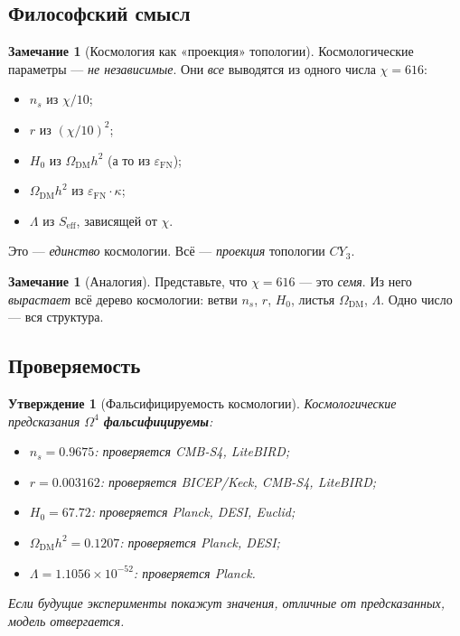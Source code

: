 \documentclass[11pt,a4paper]{article}
\newcommand{\CY}{CY_3}
\newcommand{\Om}{\Omega^4}
\newcommand{\epsFN}{\varepsilon_{\text{FN}}}
\newtheorem{proposition}[theorem]{Утверждение}
\theoremstyle{definition}
\newtheorem{remark}[theorem]{Замечание}
\begin{document}
\subsection{Философский смысл}
\label{subsec:cosmology-philosophy}

\begin{remark}[Космология как «проекция» топологии]
\label{rem:cosmology-projection}
Космологические параметры — \emph{не независимые}. Они 
\emph{все} выводятся из одного числа $\chi = 616$:
\begin{itemize}
    \item $n_s$ из $\chi/10$;
    \item $r$ из $(\chi/10)^2$;
    \item $H_0$ из $\Omega_{\text{DM}} h^2$ (а то из $\epsFN$);
    \item $\Omega_{\text{DM}} h^2$ из $\epsFN \cdot \kappa$;
    \item $\Lambda$ из $S_{\text{eff}}$, зависящей от $\chi$.
\end{itemize}
Это — \emph{единство} космологии. Всё — \emph{проекция} 
топологии $\CY$.
\end{remark}

\begin{remark}[Аналогия]
\label{rem:cosmology-analogy}
Представьте, что $\chi = 616$ — это \emph{семя}. Из него 
\emph{вырастает} всё дерево космологии: ветви $n_s$, $r$, 
$H_0$, листья $\Omega_{\text{DM}}$, $\Lambda$. 
Одно число — вся структура.
\end{remark}

\subsection{Проверяемость}
\label{subsec:cosmology-testability}

\begin{proposition}[Фальсифицируемость космологии]
\label{prop:cosmology-falsifiable}
Космологические предсказания $\Om$ \textbf{фальсифицируемы}:
\begin{itemize}
    \item $n_s = 0.9675$: проверяется CMB-S4, LiteBIRD;
    \item $r = 0.003162$: проверяется BICEP/Keck, CMB-S4, LiteBIRD;
    \item $H_0 = 67.72$: проверяется Planck, DESI, Euclid;
    \item $\Omega_{\text{DM}} h^2 = 0.1207$: проверяется 
          Planck, DESI;
    \item $\Lambda = 1.1056 \times 10^{-52}$: проверяется Planck.
\end{itemize}
Если будущие эксперименты покажут значения, отличные от 
предсказанных, модель отвергается.
\end{proposition}
\end{document}
